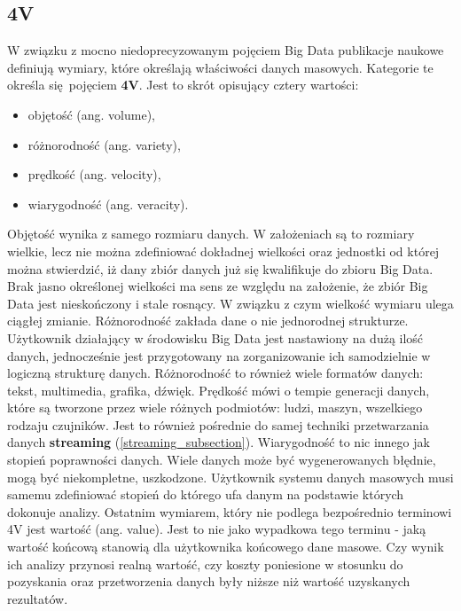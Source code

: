 \subsection{4V}
W związku z mocno niedoprecyzowanym pojęciem Big Data publikacje naukowe definiują wymiary, które określają właściwości danych masowych\cite{big_data_great_services}. Kategorie te określa się pojęciem \textbf{4V}. Jest to skrót opisujący cztery wartości:
\begin{itemize}
	\item objętość (ang. volume),
	\item różnorodność (ang. variety),
	\item prędkość (ang. velocity),
	\item wiarygodność (ang. veracity).
\end{itemize}
Objętość wynika z samego rozmiaru danych. W założeniach są to rozmiary wielkie, lecz nie można zdefiniować dokładnej wielkości oraz jednostki od której można stwierdzić, iż dany zbiór danych już się kwalifikuje do zbioru Big Data. Brak jasno określonej wielkości ma sens ze względu na założenie, że zbiór Big Data jest nieskończony i stale rosnący. W związku z czym wielkość wymiaru ulega ciągłej zmianie.\newline
Różnorodność zakłada dane o nie jednorodnej strukturze. Użytkownik działający w środowisku Big Data jest nastawiony na dużą ilość danych, jednocześnie jest przygotowany na zorganizowanie ich samodzielnie w logiczną strukturę danych. Różnorodność to również wiele formatów danych: tekst, multimedia, grafika, dźwięk.\newline
Prędkość mówi o tempie generacji danych, które są tworzone przez wiele różnych podmiotów: ludzi, maszyn, wszelkiego rodzaju czujników. Jest to również pośrednie do samej techniki przetwarzania danych \textbf{streaming} (\ref{streaming_subsection}).\newline
Wiarygodność to nic innego jak stopień poprawności danych. Wiele danych może być wygenerowanych błędnie, mogą być niekompletne, uszkodzone. Użytkownik systemu danych masowych musi samemu zdefiniować stopień do którego ufa danym na podstawie których dokonuje analizy.\newline
Ostatnim wymiarem, który nie podlega bezpośrednio terminowi 4V jest wartość (ang. value). Jest to nie jako wypadkowa tego terminu - jaką wartość końcową stanowią dla użytkownika końcowego dane masowe. Czy wynik ich analizy przynosi realną wartość, czy koszty poniesione w stosunku do pozyskania oraz przetworzenia danych były niższe niż wartość uzyskanych rezultatów.
